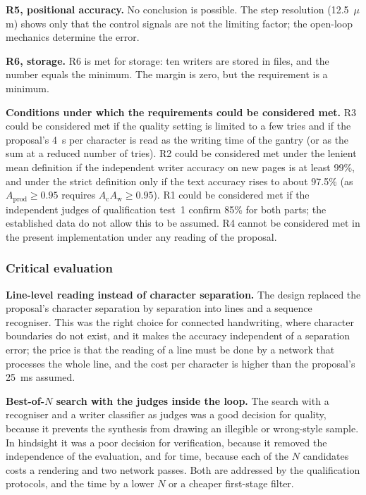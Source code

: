        \textbf{R5, positional accuracy.}
        No conclusion is possible.
        The step resolution (12.5~$\mu$m) shows only that the control signals are not the limiting factor; the open-loop mechanics determine the error.

        \textbf{R6, storage.}
        R6 is met for storage: ten writers are stored in files, and the number equals the minimum.
        The margin is zero, but the requirement is a minimum.

        \textbf{Conditions under which the requirements could be considered met.}
        R3 could be considered met if the quality setting is limited to a few tries and if the proposal's 4~s per character is read as the writing time of the gantry (or as the sum at a reduced number of tries).
        R2 could be considered met under the lenient mean definition if the independent writer accuracy on new pages is at least 99\%, and under the strict definition only if the text accuracy rises to about 97.5\% (as $A_{\mathrm{prod}}\ge0.95$ requires $A_{\mathrm{c}}A_{\mathrm{w}}\ge0.95$).
        R1 could be considered met if the independent judges of qualification test~1 confirm 85\% for both parts; the established data do not allow this to be assumed.
        R4 cannot be considered met in the present implementation under any reading of the proposal.

    \subsubsection{Critical evaluation}
    \label{sec:dis-crit}

        \textbf{Line-level reading instead of character separation.}
        The design replaced the proposal's character separation by separation into lines and a sequence recogniser.
        This was the right choice for connected handwriting, where character boundaries do not exist, and it makes the accuracy independent of a separation error; the price is that the reading of a line must be done by a network that processes the whole line, and the cost per character is higher than the proposal's 25~ms assumed.

        \textbf{Best-of-$N$ search with the judges inside the loop.}
        The search with a recogniser and a writer classifier as judges was a good decision for quality, because it prevents the synthesis from drawing an illegible or wrong-style sample.
        In hindsight it was a poor decision for verification, because it removed the independence of the evaluation, and for time, because each of the $N$ candidates costs a rendering and two network passes.
        Both are addressed by the qualification protocols, and the time by a lower $N$ or a cheaper first-stage filter.

